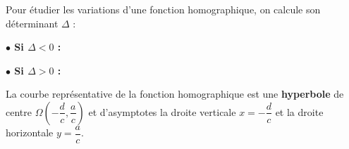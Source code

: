 \begin{Propriete}[Variations]

Pour étudier les variations d'une fonction homographique, on calcule son déterminant $\Delta$ :

\vspace{0.2cm}
\noindent
\begin{minipage}[t]{0.48\linewidth}
\begin{center}
\textbf{$\bullet$ Si $\Delta < 0$ :}
\end{center}
\vspace{0.2cm}
\begin{center}
\end{center}
\end{minipage}
\hfill
\begin{minipage}[t]{0.48\linewidth}
\begin{center}
\textbf{$\bullet$ Si $\Delta > 0$ :}
\end{center}
\vspace{0.2cm}
\begin{center}
\end{center}
\end{minipage}
\end{Propriete}






\begin{Propriete}[Courbe]
La courbe représentative de la fonction homographique est une \textbf{hyperbole} de centre $\Omega\left(-\dfrac{d}{c}, \dfrac{a}{c}\right)$ et d'asymptotes la droite verticale $x=-\dfrac{d}{c}$ et la droite horizontale $y=\dfrac{a}{c}$.
\end{Propriete}







